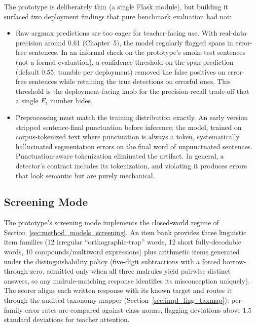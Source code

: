 The prototype is deliberately thin (a single Flask module), but building it surfaced two deployment findings that pure benchmark evaluation had not:
\begin{itemize}
    \item Raw argmax predictions are too eager for teacher-facing use. With real-data precision around 0.61 (Chapter~5), the model regularly flagged spans in error-free sentences. In an informal check on the prototype's smoke-test sentences (not a formal evaluation), a confidence threshold on the span prediction (default $0.55$, tunable per deployment) removed the false positives on error-free sentences while retaining the true detections on errorful ones. This threshold is the deployment-facing knob for the precision-recall trade-off that a single $F_1$ number hides.
    \item Preprocessing must match the training distribution exactly. An early version stripped sentence-final punctuation before inference; the model, trained on corpus-tokenized text where punctuation is always a token, systematically hallucinated segmentation errors on the final word of unpunctuated sentences. Punctuation-aware tokenization eliminated the artifact. In general, a detector's contract includes its tokenization, and violating it produces errors that look semantic but are purely mechanical.
\end{itemize}

\subsection{Screening Mode}
\label{sec:impl_prototype_screening}

The prototype's screening mode implements the closed-world regime of Section~\ref{sec:method_models_screening}. An item bank provides three linguistic item families (12 irregular ``orthographic-trap'' words, 12 short fully-decodable words, 10 compounds/multiword expressions) plus arithmetic items generated under the distinguishability policy (five-digit subtractions with a forced borrow-through-zero, admitted only when all three malrules yield pairwise-distinct answers, so any malrule-matching response identifies its misconception uniquely). The scorer aligns each written response with its known target and routes it through the audited taxonomy mapper (Section~\ref{sec:impl_ling_taxmap}); per-family error rates are compared against class norms, flagging deviations above $1.5$ standard deviations for teacher attention.

